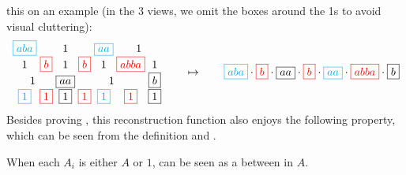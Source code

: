 this on an example (in the 3 views, we omit the boxes around the 1s to avoid
visual cluttering):
\[\arraycolsep=1.4pt\def\arraystretch{1.2}
  \begin{array}{ccccccc}
    \blue{\boxed{aba}}
    & & 1 & &
    \blue{\boxed{aa}} & \multicolumn{2}{c}{1} \\
    1 &
    \red{\boxed{b}} &  
    1 & 
    \red{\boxed{b}} & 
    1 & 
      \red{\boxed{abba}} & 1\\
     \multicolumn{2}{c}{1} & 
    \boxed{aa} & \multicolumn{3}{c}{1} & 
    \boxed{b}\\
    \blue{\boxed{1}} &
    \red{\boxed{1}} &
    \boxed{1} &
    \red{\boxed{1}} &
    \blue{\boxed{1}} &
    \red{\boxed{1}} &
    \boxed{1}
  \end{array}
  \qquad\mapsto\qquad \blue{\boxed{aba}} \cdot 
  \red{\boxed{b}} \cdot 
  \boxed{aa} \cdot 
  \red{\boxed{b}} \cdot 
  \blue{\boxed{aa}} \cdot 
  \red{\boxed{abba}} \cdot 
  \boxed{b}
\]
Besides proving , this reconstruction function also enjoys the
following property, which can be seen from the definition and
.
\begin{proposition}\label{prop:reconstruction}
  When each $A_i$ is either $A$ or $1$,  can be seen as a  between  in $A$.
\end{proposition}
